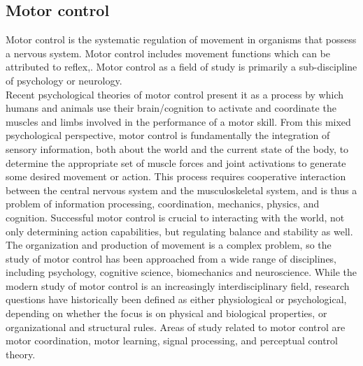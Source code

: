 \subsection{Motor control}
Motor control is the systematic regulation of movement in organisms that possess 
a nervous system. Motor control includes movement functions which can be attributed 
to reflex,\cite{BehaviorlaStudy1964}. Motor control as a field of study is primarily a sub-discipline of 
psychology or neurology.\\


Recent psychological theories of motor control present it as a process by which 
humans and animals use their brain/cognition to activate and coordinate the muscles 
and limbs involved in the performance of a motor skill. From this mixed psychological 
perspective, motor control is fundamentally the integration of sensory information, 
both about the world and the current state of the body, to determine the appropriate 
set of muscle forces and joint activations to generate some desired movement or action. 
This process requires cooperative interaction between the central nervous system and 
the musculoskeletal system, and is thus a problem of information processing, 
coordination, mechanics, physics, and cognition.\cite{RoboticMovement, EnhanceEmpiri2011} Successful motor control 
is crucial to interacting with the world, not only determining action capabilities, 
but regulating balance and stability as well.\\


The organization and production of movement is a complex problem, so the study of 
motor control has been approached from a wide range of disciplines, including 
psychology, cognitive science, biomechanics and neuroscience. While the modern 
study of motor control is an increasingly interdisciplinary field, research 
questions have historically been defined as either physiological or psychological, 
depending on whether the focus is on physical and biological properties, or 
organizational and structural rules.\cite{DOMER2011} Areas of study related to motor control 
are motor coordination, motor learning, signal processing, and perceptual control 
theory.\\





